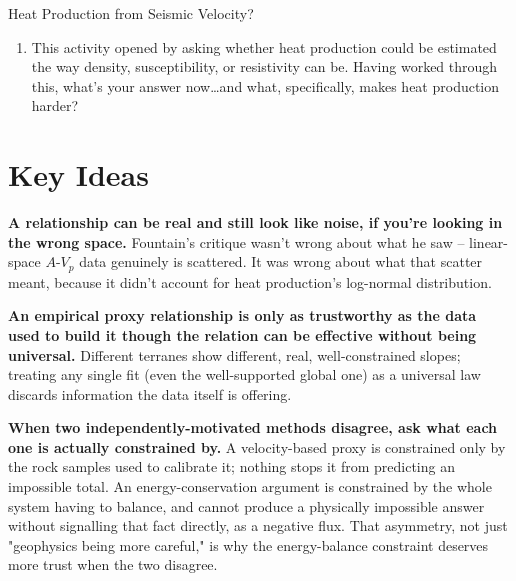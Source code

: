 \begin{activity}{Heat Production from Seismic Velocity?}
\begin{questions}
\begin{enumerate}[label=(\alph*)]
    \item This activity opened by asking whether heat production could be estimated the way density, susceptibility, or resistivity can be. Having worked through this, what's your answer now\ldots and what, specifically, makes heat production harder?
    \answerbox[2.5cm]
  \end{enumerate}

\end{questions}

\section*{Key Ideas}

\textbf{A relationship can be real and still look like noise, if you're looking in the wrong space.} Fountain's critique wasn't wrong about what he saw -- linear-space $A$-$V_p$ data genuinely is scattered. It was wrong about what that scatter meant, because it didn't account for heat production's log-normal distribution.

\textbf{An empirical proxy relationship is only as trustworthy as the data used to build it though the relation can be effective without being universal.} Different terranes show different, real, well-constrained slopes; treating any single fit (even the well-supported global one) as a universal law discards information the data itself is offering.

\textbf{When two independently-motivated methods disagree, ask what each one is actually constrained by.} A velocity-based proxy is constrained only by the rock samples used to calibrate it; nothing stops it from predicting an impossible total. An energy-conservation argument is constrained by the whole system having to balance, and cannot produce a physically impossible answer without signalling that fact directly, as a negative flux. That asymmetry, not just "geophysics being more careful," is why the energy-balance constraint deserves more trust when the two disagree.

\end{activity}